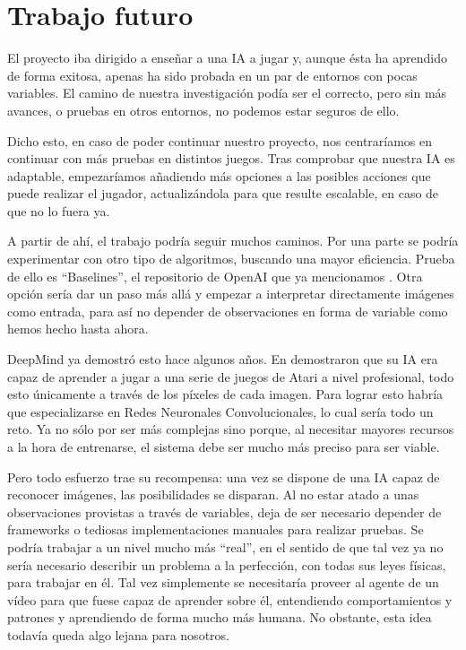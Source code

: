 \section{Trabajo futuro}

El proyecto iba dirigido a enseñar a una IA a jugar y, aunque ésta ha aprendido de forma exitosa, apenas ha sido probada en un par de entornos con pocas variables. El camino de nuestra investigación podía ser el correcto, pero sin más avances, o pruebas en otros entornos, no podemos estar seguros de ello. 

Dicho esto, en caso de poder continuar nuestro proyecto, nos centraríamos en continuar con más pruebas en distintos juegos. Tras comprobar que nuestra IA es adaptable, empezaríamos añadiendo más opciones a las posibles acciones que puede realizar el jugador, actualizándola para que resulte escalable, en caso de que no lo fuera ya. 

A partir de ahí, el trabajo podría seguir muchos caminos. Por una parte se podría experimentar con otro tipo de algoritmos, buscando una mayor eficiencia. Prueba de ello es ``Baselines'', el repositorio de OpenAI que ya mencionamos \citep{baselines}. Otra opción sería dar un paso más allá y empezar a interpretar directamente imágenes como entrada, para así no depender de observaciones en forma de variable como hemos hecho hasta ahora.

DeepMind ya demostró esto hace algunos años. En \citet{mnih2013playing} demostraron que su IA era capaz de aprender a jugar a una serie de juegos de Atari a nivel profesional, todo esto únicamente a través de los píxeles de cada imagen. Para lograr esto habría que especializarse en Redes Neuronales Convolucionales, lo cual sería todo un reto. Ya no sólo por ser más complejas sino porque, al necesitar mayores recursos a la hora de entrenarse, el sistema debe ser mucho más preciso para ser viable.

Pero todo esfuerzo trae su recompensa: una vez se dispone de una IA capaz de reconocer imágenes, las posibilidades se disparan. Al no estar atado a unas observaciones provistas a través de variables, deja de ser necesario depender de frameworks o tediosas implementaciones manuales para realizar pruebas. Se podría trabajar a un nivel mucho más ``real'', en el sentido de que tal vez ya no sería necesario describir un problema a la perfección, con todas sus leyes físicas, para trabajar en él. Tal vez simplemente se necesitaría proveer al agente de un vídeo para que fuese capaz de aprender sobre él, entendiendo comportamientos y patrones y aprendiendo de forma mucho más humana. No obstante, esta idea todavía queda algo lejana para nosotros.
